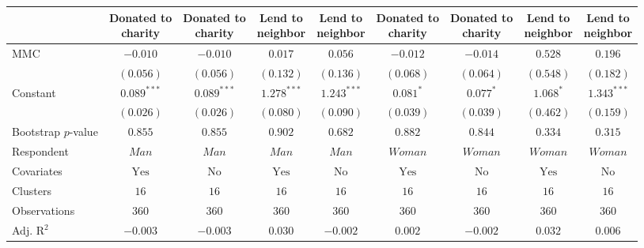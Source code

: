 
\begin{tabular}{l c c c c c c c c}
\toprule
 & \shortstack{Donated to\\charity} & \shortstack{Donated to\\charity} & \shortstack{Lend to\\neighbor} & \shortstack{Lend to\\neighbor} & \shortstack{Donated to\\charity} & \shortstack{Donated to\\charity} & \shortstack{Lend to\\neighbor} & \shortstack{Lend to\\neighbor} \\
\midrule
MMC                 & $-0.010$       & $-0.010$      & $0.017$        & $0.056$       & $-0.012$       & $-0.014$      & $0.528$        & $0.196$       \\
                    & $(0.056)$      & $(0.056)$     & $(0.132)$      & $(0.136)$     & $(0.068)$      & $(0.064)$     & $(0.548)$      & $(0.182)$     \\
Constant            & $0.089^{***}$  & $0.089^{***}$ & $1.278^{***}$  & $1.243^{***}$ & $0.081^{*}$    & $0.077^{*}$   & $1.068^{*}$    & $1.343^{***}$ \\
                    & $(0.026)$      & $(0.026)$     & $(0.080)$      & $(0.090)$     & $(0.039)$      & $(0.039)$     & $(0.462)$      & $(0.159)$     \\
\midrule
Bootstrap $p$-value & $0.855$        & $0.855$       & $0.902$        & $0.682$       & $0.882$        & $0.844$       & $0.334$        & $0.315$       \\
Respondent          & $Man$          & $Man$         & $Man$          & $Man$         & $Woman$        & $Woman$       & $Woman$        & $Woman$       \\
Covariates          & $\textrm{Yes}$ & $\textrm{No}$ & $\textrm{Yes}$ & $\textrm{No}$ & $\textrm{Yes}$ & $\textrm{No}$ & $\textrm{Yes}$ & $\textrm{No}$ \\
Clusters            & $16$           & $16$          & $16$           & $16$          & $16$           & $16$          & $16$           & $16$          \\
Observations        & $360$          & $360$         & $360$          & $360$         & $360$          & $360$         & $360$          & $360$         \\
Adj. R$^2$          & $-0.003$       & $-0.003$      & $0.030$        & $-0.002$      & $0.002$        & $-0.002$      & $0.032$        & $0.006$       \\

\end{tabular}
